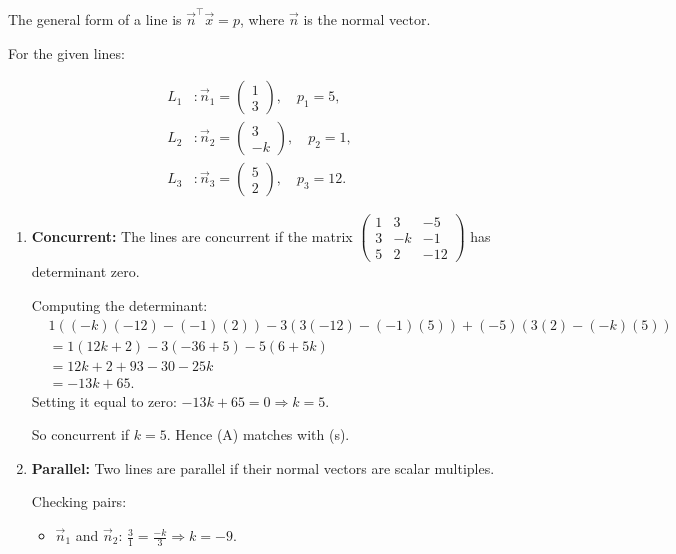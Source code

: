 \documentclass[journal]{IEEEtran}
\begin{document}
\begin{question}
\\ 
\solution \\
\begin{solution}
The general form of a line is $\vec{n}^\top \vec{x} = p$, where $\vec{n}$ is the normal vector.

For the given lines:

\begin{align*}
L_1 &: \vec{n}_1 = \begin{pmatrix} 1 \\ 3 \end{pmatrix}, \quad p_1 = 5, \\
L_2 &: \vec{n}_2 = \begin{pmatrix} 3 \\ -k \end{pmatrix}, \quad p_2 = 1, \\
L_3 &: \vec{n}_3 = \begin{pmatrix} 5 \\ 2 \end{pmatrix}, \quad p_3 = 12.
\end{align*}

\begin{enumerate}[label=(\Alph*)]
    \item \textbf{Concurrent:} The lines are concurrent if the matrix
    $\begin{pmatrix} 1 & 3 & -5 \\ 3 & -k & -1 \\ 5 & 2 & -12 \end{pmatrix}$
    has determinant zero.

    Computing the determinant:
    \begin{align*}
    &1((-k)(-12) - (-1)(2)) - 3(3(-12) - (-1)(5)) + (-5)(3(2) - (-k)(5)) \\
    &= 1(12k + 2) - 3(-36 + 5) - 5(6 + 5k) \\
    &= 12k + 2 + 93 - 30 - 25k \\
    &= -13k + 65.
    \end{align*}
    Setting it equal to zero: $-13k + 65 = 0 \Rightarrow k = 5$.

    So concurrent if $k = 5$. Hence (A) matches with (s).

    \item \textbf{Parallel:} Two lines are parallel if their normal vectors are scalar multiples.

    Checking pairs:

    \begin{itemize}
        \item $\vec{n}_1$ and $\vec{n}_2$: $\frac{3}{1} = \frac{-k}{3} \Rightarrow k = -9$.


\end{itemize}
\end{enumerate}
\end{solution}
\end{question}
\end{document}
